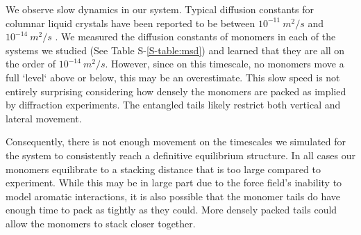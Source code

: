 \documentclass[journal=jpcbfk,manuscript=article]{achemso}
\begin{document}
  We observe slow dynamics in our system. Typical diffusion constants for columnar
  liquid crystals have been reported to be between $10^{-11}~ m^2/s$ 
  \cite{dong_translational_1984} and $10^{-14}~m^2/s$ \cite{dvinskikh_molecular_2002}. 
  We measured the diffusion constants of monomers in each of the systems we
  studied (See Table S-\ref{S-table:msd}) and learned that they are all on the order of
  $10^{-14}~m^2/s$. However, since on this timescale, no monomers move
  a full `level` above or below, this may be an overestimate. This slow speed is
  not entirely surprising considering how densely the monomers are
  packed as implied by diffraction experiments. The entangled tails
  likely restrict both vertical and lateral movement.
  


  Consequently, there is not enough movement on the timescales we simulated for the system to 
  consistently reach a definitive equilibrium structure.
  In all cases our monomers
  equilibrate to a stacking distance that is too large compared to experiment. 
  While this may be in large part due to the force field's inability to model aromatic
  interactions, it is also possible that the monomer tails do have enough time to pack 
  as tightly as they could. More densely packed tails could allow the monomers to stack
  closer together. 
  
\end{document}
